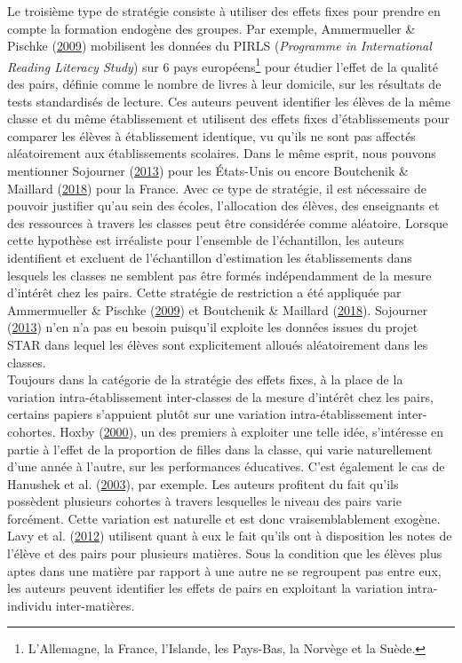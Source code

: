 \documentclass[
]{book}
\begin{document}
\quad Le troisième type de stratégie consiste à utiliser des effets fixes pour prendre en compte la formation endogène des groupes. Par exemple, Ammermueller \& Pischke (\protect\hyperlink{ref-AMM:PIS:09}{2009}) mobilisent les données du PIRLS (\emph{Programme in International Reading Literacy Study}) sur 6 pays européens\footnote{L'Allemagne, la France, l'Islande, les Pays-Bas, la Norvège et la Suède.} pour étudier l'effet de la qualité des pairs, définie comme le nombre de livres à leur domicile, sur les résultats de tests standardisés de lecture. Ces auteurs peuvent identifier les élèves de la même classe et du même établissement et utilisent des effets fixes d'établissements pour comparer les élèves à établissement identique, vu qu'ils ne sont pas affectés aléatoirement aux établissements scolaires. Dans le même esprit, nous pouvons mentionner Sojourner (\protect\hyperlink{ref-SOJ:13}{2013}) pour les États-Unis ou encore Boutchenik \& Maillard (\protect\hyperlink{ref-BOU:MAI:18}{2018}) pour la France. Avec ce type de stratégie, il est nécessaire de pouvoir justifier qu'au sein des écoles, l'allocation des élèves, des enseignants et des ressources à travers les classes peut être considérée comme aléatoire. Lorsque cette hypothèse est irréaliste pour l'ensemble de l'échantillon, les auteurs identifient et excluent de l'échantillon d'estimation les établissements dans lesquels les classes ne semblent pas être formés indépendamment de la mesure d'intérêt chez les pairs. Cette stratégie de restriction a été appliquée par Ammermueller \& Pischke (\protect\hyperlink{ref-AMM:PIS:09}{2009}) et Boutchenik \& Maillard (\protect\hyperlink{ref-BOU:MAI:18}{2018}). Sojourner (\protect\hyperlink{ref-SOJ:13}{2013}) n'en n'a pas eu besoin puisqu'il exploite les données issues du projet STAR dans lequel les élèves sont explicitement alloués aléatoirement dans les classes.\\
Toujours dans la catégorie de la stratégie des effets fixes, à la place de la variation intra-établissement inter-classes de la mesure d'intérêt chez les pairs, certains papiers s'appuient plutôt sur une variation intra-établissement inter-cohortes. Hoxby (\protect\hyperlink{ref-HOX:00}{2000}), un des premiers à exploiter une telle idée, s'intéresse en partie à l'effet de la proportion de filles dans la classe, qui varie naturellement d'une année à l'autre, sur les performances éducatives. C'est également le cas de Hanushek et al. (\protect\hyperlink{ref-HAN:eal:03}{2003}), par exemple. Les auteurs profitent du fait qu'ils possèdent plusieurs cohortes à travers lesquelles le niveau des pairs varie forcément. Cette variation est naturelle et est donc vraisemblablement exogène.\\
Lavy et al. (\protect\hyperlink{ref-LAV:eal:12}{2012}) utilisent quant à eux le fait qu'ils ont à disposition les notes de l'élève et des pairs pour plusieurs matières. Sous la condition que les élèves plus aptes dans une matière par rapport à une autre ne se regroupent pas entre eux, les auteurs peuvent identifier les effets de pairs en exploitant la variation intra-individu inter-matières.
\end{document}
